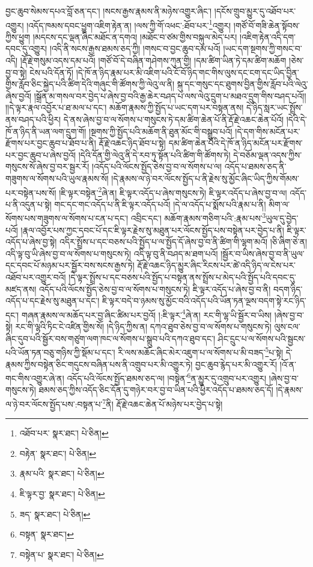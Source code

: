 བྱང་ཆུབ་སེམས་དཔའ་བློ་ཅན་དང་། །སངས་རྒྱས་རྣམས་ནི་མཉེས་འགྱུར་ཞིང་། །དངོས་གྲུབ་མྱུར་དུ་འཐོབ་པར་འགྱུར། །འདོད་ཁམས་དབང་ཕྱུག་འཇིག་རྟེན་ན། །ལས་ཀྱི་གོ་འཕང་:ཐོབ་པར་\footnote{འཐོབ་པར་  སྣར་ཐང་།  པེ་ཅིན། }འགྱུར། །གཙོ་བོ་གཟི་ཆེན་སྟོབས་ཀྱིས་ཕྱུག །མདངས་དང་ལྡན་ཞིང་མཐོང་ན་དགའ། །མཐོང་བ་ཙམ་གྱིས་བསྐུལ་མེད་པར། །འཇིག་རྟེན་འདི་དག་དབང་དུ་འགྱུར། །འདི་ནི་སངས་རྒྱས་ཐམས་ཅད་ཀྱི། །གསང་བ་བྱང་ཆུབ་དམ་པའོ། །ཡང་དག་སྔགས་ཀྱི་གསང་བ་འདི། །རྡོ་རྗེ་གསུམ་འདས་དམ་པའོ། །གཙོ་བོ་དེ་བཞིན་གཤེགས་ཀུན་གྱི། །དམ་ཚིག་ཡིན་ཏེ་དམ་ཚིག་མཆོག །ཅེས་བྱ་བ་སྟེ། ངེས་པའི་དོན་ཏོ། །དེ་ཁོ་ན་ཉིད་རྣམ་པར་མི་འཇིག་པའི་ངོ་བོ་ཉིད་གང་གིས་ལུས་དང་ངག་དང་ཡིད་བྱིན་གྱིས་རློབ་ཅིང་སྐྱེད་པའི་ཚིག་དེའི་གཞུང་གི་ཚོགས་ཀྱི་ལེའུ་ལ་ནི། སྐུ་དང་གསུང་དང་ཐུགས་བྱིན་གྱིས་རློབ་པའི་ལེའུ་ཞེས་བྱའོ། །སྒྲོན་མ་གསལ་བར་བྱེད་པ་ཞེས་བྱ་བའི་རྒྱ་ཆེར་བཤད་པ་ལས་ལེའུ་དྲུག་པ་མཐའ་དྲུག་གིས་བཤད་པའོ།། །།དེ་ལྟར་རྣལ་འབྱོར་པ་ཐ་མལ་པ་དང་། མཆོག་རྣམས་ཀྱི་སྤྱོད་པ་ཡང་དག་པར་བསྟན་ནས། དེ་ཉིད་སླར་ཡང་སྤྲོས་ནས་བཤད་པའི་ཕྱིར། དེ་ནས་ཞེས་བྱ་བ་ལ་སོགས་པ་གསུངས་ཏེ་དམ་ཚིག་ཆེན་པོ་ནི་རྡོ་རྗེ་འཆང་ཆེན་པོའོ། །དེའི་དེ་ཁོ་ན་ཉིད་ནི་ཡན་ལག་དྲུག་གོ། །སྔགས་ཀྱི་སྤྱོད་པའི་མཆོག་ནི་ཐུན་མོང་གི་བསྒྲུབ་པའོ། །དེ་དག་གིས་མངོན་པར་རྫོགས་པར་བྱང་ཆུབ་པ་ཐོབ་པ་ནི། རྡོ་རྗེ་འཆང་ཉིད་ཐོབ་པ་སྟེ། དམ་ཚིག་ཆེན་པོའི་དེ་ཁོ་ན་ཉིད་མངོན་པར་རྫོགས་པར་བྱང་ཆུབ་པ་ཞེས་བྱའོ། །དེའི་དོན་གྱི་ལེའུ་ནི་དེ་རབ་ཏུ་སྟོན་པའི་ཚིག་གི་ཚོགས་ཏེ། དེ་བཅོམ་ལྡན་འདས་ཀྱིས་གསུངས་སོ་ཞེས་བྱ་བར་སྦྱར་རོ། །འདོད་པའི་ལོངས་སྤྱོད་ཅེས་བྱ་བ་ལ་སོགས་པ་ལ། འདོད་པ་ཐམས་ཅད་ནི་གཟུགས་ལ་སོགས་པའི་ཡུལ་རྣམས་སོ། །དེ་རྣམས་ལ་ཉེ་བར་ལོངས་སྤྱོད་པ་ནི་རྗེས་སུ་མྱོང་ཞིང་ཡིད་ཀྱིས་གོམས་པར་བསྟེན་པས་སོ། །ཇི་ལྟར་བསྟེན་\footnote{བརྟེན་  སྣར་ཐང་།  པེ་ཅིན། }ཞེ་ན། ཇི་ལྟར་འདོད་པ་ཞེས་གསུངས་ཏེ། ཇི་ལྟར་འདོད་པ་ཞེས་བྱ་བ་ལ། འདོད་པ་ནི་འདུན་པ་སྟེ། གང་དང་གང་འདོད་པ་ནི་ཇི་ལྟར་འདོད་པའོ། །དེ་ལ་འདོད་པ་སྨོས་པའི་རྣམ་པ་ནི། མིག་ལ་སོགས་པས་གཟུགས་ལ་སོགས་པ་ངན་པ་དང་། འབྲིང་དང་། མཆོག་རྣམས་གཅིག་པའི་:རྣམ་པས་\footnote{རྣམ་པའི་  སྣར་ཐང་།  པེ་ཅིན། }ཡུལ་དུ་བྱེད་པའོ། །རྣལ་འབྱོར་པས་ཀྱང་དབང་པོ་དང་ཇི་ལྟར་རྗེས་སུ་མཐུན་པར་ལོངས་སྤྱོད་པས་བསྟེན་པར་བྱེད་པ་ནི། ཇི་ལྟར་འདོད་པ་ཞེས་བྱ་སྟེ། འདིར་སྤྲོས་པ་དང་བཅས་པའི་སྤྱོད་པ་ལ་སྤྱོད་དོ་ཞེས་བྱ་བ་ནི་ཚིག་གི་ལྷག་མའོ། །ཅི་ཞིག་ཅེ་ན། འདི་ལྟ་བུ་ཡི་ཞེས་བྱ་བ་ལ་སོགས་པ་གསུངས་ཏེ། འདི་ལྟ་བུ་ནི་བཤད་མ་ཐག་པའོ། །སྦྱོར་བ་ཡིས་ཞེས་བྱ་བ་ནི་ཡུལ་དང་དབང་པོ་མཉམ་པར་སྦྱོར་བས་སངས་རྒྱས་ཏེ། རྡོ་རྗེ་འཆང་ཉིད་མྱུར་ཞིང་རིངས་པར་ཚེ་འདི་ཉིད་ལ་ངེས་པར་འཐོབ་པར་འགྱུར་བའོ། །དེ་ལྟར་སྤྲོས་པ་དང་བཅས་པའི་སྤྱོད་པ་བསྟན་ནས་སྤྲོས་པ་མེད་པའི་སྤྱོད་པའི་དབང་དུ་མཛད་ནས། འདོད་པའི་ལོངས་སྤྱོད་ཅེས་བྱ་བ་ལ་སོགས་པ་གསུངས་ཏེ། ཇི་ལྟར་འདོད་པ་ཞེས་བྱ་བ་ནི། བདག་ཉིད་འདོད་པ་དང་རྗེས་སུ་མཐུན་པ་དང་། ཇི་ལྟར་བདེ་བ་ཉམས་སུ་མྱོང་བའི་འདོད་པའི་ཡོན་ཏན་ལྔས་བདག་སྟེ་རང་ཉིད་དང་། གཞན་རྣམས་ལ་མཆོད་པར་བྱ་ཞིང་ཚིམ་པར་བྱའོ། །:ཇི་ལྟར་\footnote{ཇི་ལྟར་བྱ་  སྣར་ཐང་།  པེ་ཅིན། }ཞེ་ན། རང་གི་ལྷ་ཡི་སྦྱོར་བ་ཡིས། །ཞེས་བྱ་བ་སྟེ། རང་གི་ལྷའི་ཏིང་ངེ་འཛིན་གྱིས་སོ། །དེ་ཉིད་ཀྱིས་ན། དཀའ་ཐུབ་ཅེས་བྱ་བ་ལ་སོགས་པ་གསུངས་ཏེ། ལུས་ངལ་ཞིང་དུབ་པའི་སྦྱོར་བས་གཙུག་ལག་ཁང་ལ་སོགས་པ་སྒྲུབ་པའི་དཀའ་ཐུབ་དང་། ཤིང་དྲུང་པ་ལ་སོགས་པའི་སྦྱངས་པའི་ཡོན་ཏན་བཅུ་གཉིས་ཀྱི་སྡོམ་པ་དང་། རི་ལས་མཆོང་ཞིང་མེར་འཇུག་པ་ལ་སོགས་པ་མི་བཟད་\footnote{ཟད་  སྣར་ཐང་།  པེ་ཅིན། }པ་སྟེ། དེ་རྣམས་ཀྱིས་བསྟེན་ཅིང་གདུངས་བཞིན་པས་ནི་འགྲུབ་པར་མི་འགྱུར་ཏེ། བྱང་ཆུབ་རྙེད་པར་མི་འགྱུར་རོ། །འོ་ན་གང་གིས་འགྱུར་ཞེ་ན། འདོད་པའི་ལོངས་སྤྱོད་ཐམས་ཅད་ལ། །བསྟེན་\footnote{བསྟན་  སྣར་ཐང་། }ན་མྱུར་དུ་འགྲུབ་པར་འགྱུར། །ཞེས་བྱ་བ་གསུངས་ཏེ། ཐམས་ཅད་ཀྱིས་འདོད་ཅིང་དོན་དུ་གཉེར་བར་བྱ་བ་ཡིན་པའི་ཕྱིར་འདོད་པ་ཐམས་ཅད་དོ། །དེ་རྣམས་ལ་ཉེ་བར་ལོངས་སྤྱོད་པས་:བསྟན་པ་\footnote{བསྟེན་པ་  སྣར་ཐང་།  པེ་ཅིན། }ནི། རྡོ་རྗེ་འཆང་ཆེན་པོ་མཉེས་པར་བྱེད་པ་སྟེ། 